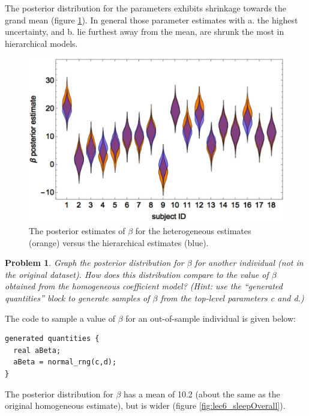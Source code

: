 \documentclass{article}
\newtheorem{problem}{Problem}[section]
\begin{document}
The posterior distribution for the parameters exhibits shrinkage towards the grand mean (figure \ref{fig:lec6_sleepShrinkage}). In general those parameter estimates with a. the highest uncertainty, and b. lie furthest away from the mean, are shrunk the most in hierarchical models.

\begin{figure}[ht]
	\centerline{\includegraphics[width=1.5\textwidth]{figures/lec6_sleepShrinkage.pdf}}
	\caption{The posterior estimates of $\beta$ for the heterogeneous estimates (orange) versus the hierarchical estimates (blue).}\label{fig:lec6_sleepShrinkage}
\end{figure}

\begin{problem}
	Graph the posterior distribution for $\beta$ for another individual (not in the original dataset). How does this distribution compare to the value of $\beta$ obtained from the homogeneous coefficient model? (Hint: use the ``generated quantities'' block to generate samples of $\beta$ from the top-level parameters c and d.)
\end{problem}

The code to sample a value of $\beta$ for an out-of-sample individual is given below:
\begin{verbatim}
generated quantities {
  real aBeta;
  aBeta = normal_rng(c,d);
}
\end{verbatim}

The posterior distribution for $\beta$ has a mean of 10.2 (about the same as the original homogeneous estimate), but is wider (figure \ref{fig:lec6_sleepOverall}).
\end{document}
